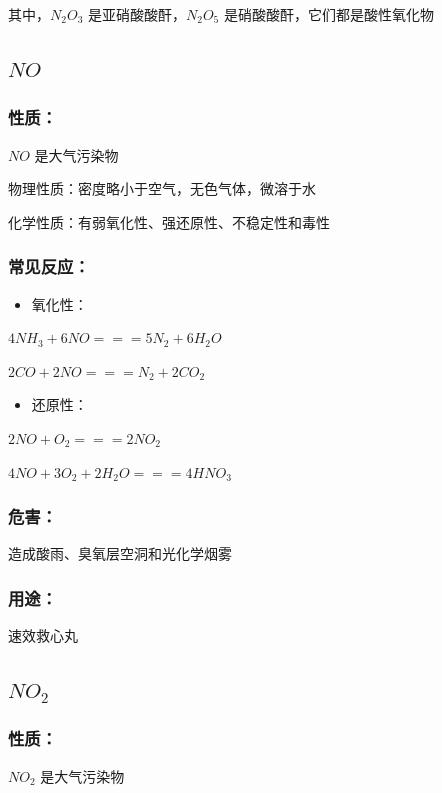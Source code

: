 \documentclass[UTF8,zihao=-4,openany]{ctexbook}
\begin{document}
其中，$N_2O_3$ 是亚硝酸酸酐，$N_2O_5$ 是硝酸酸酐，它们都是酸性氧化物\par
\subsection{$NO$}
\subsubsection{性质：}
$NO$ 是大气污染物\par

物理性质：密度略小于空气，无色气体，微溶于水\par

化学性质：有弱氧化性、强还原性、不稳定性和毒性\par
\subsubsection{常见反应：}
\begin{itemize}
\item 氧化性：
\end{itemize}

$4NH_3+6NO=\!=\!=5N_2+6H_2O$\par

$2CO+2NO=\!=\!=N_2+2CO_2$\par

\begin{itemize}
\item 还原性：
\end{itemize}

$2NO+O_2=\!=\!=2NO_2$\par

$4NO+3O_2+2H_2O=\!=\!=4HNO_3$\par
\subsubsection{危害：}
造成酸雨、臭氧层空洞和光化学烟雾\par
\subsubsection{用途：}
速效救心丸\par
\subsection{$NO_2$}
\subsubsection{性质：}
$NO_2$ 是大气污染物\par
\end{document}
